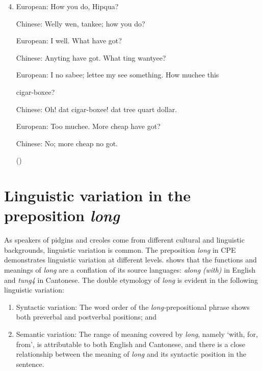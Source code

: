 \documentclass[output=paper]{langsci/langscibook}
\begin{document}
\begin{enumerate}
\setcounter{enumi}{3}\renewcommand{\labelenumi}{$(\theenumi)$}
    \label{(4)}
    \gll\\
        \\
    \glt
    \z

    \item      European:  How you do, Hipqua?

Chinese:    Welly wen, tankee; how you do?

European:  I well. What have got?

Chinese:    Anyting have got. What ting wantyee?

European:  I no sabee; lettee my see something. How muchee this 

cigar-boxee?

Chinese:    Oh! dat cigar-boxee! dat tree quart dollar.

European:  Too muchee. More cheap have got?

Chinese:    No; more cheap no got.

(\citealt[301]{duer_pigeon-english_1860})

\end{enumerate}

\section{Linguistic variation in the preposition \textit{long}}

As speakers of pidgins and creoles come from different cultural and linguistic backgrounds, linguistic variation is common. The preposition \textit{long} in CPE demonstrates linguistic variation at different levels. \citet{li_origins_2011} shows that the functions and meanings of \textit{long} are a conflation of its source languages: \textit{along} \textit{(with)} in English and \textit{tung4} in Cantonese. The double etymology of \textit{long} is evident in the following linguistic variation:

\begin{enumerate}
\renewcommand{\labelenumi}{\alph{enumi})}
\item Syntactic variation: The word order of the \textit{long-}prepositional phrase shows both preverbal and postverbal positions; and 

\item Semantic variation: The range of meaning covered by \textit{long}, namely ‘with, for, from’, is attributable to both English and Cantonese, and there is a close relationship between the meaning of \textit{long} and its syntactic position in the sentence.

\end{enumerate}
\end{document}
